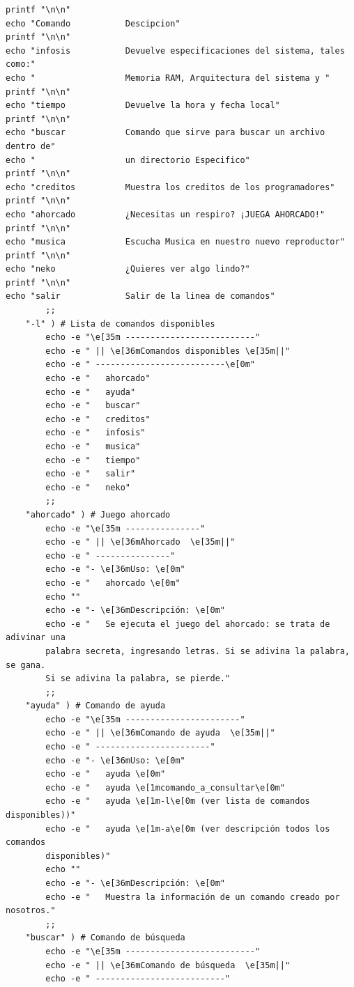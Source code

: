 \documentclass[12pt,a4paper]{article}
\begin{document}
\begin{lstlisting}[style=BashInputStyle]
printf "\n\n"
echo "Comando           Descipcion"
printf "\n\n"
echo "infosis           Devuelve especificaciones del sistema, tales como:"
echo "                  Memoria RAM, Arquitectura del sistema y "
printf "\n\n"
echo "tiempo            Devuelve la hora y fecha local"
printf "\n\n"
echo "buscar            Comando que sirve para buscar un archivo dentro de"
echo "                  un directorio Especifico"
printf "\n\n"
echo "creditos          Muestra los creditos de los programadores"
printf "\n\n"
echo "ahorcado          ¿Necesitas un respiro? ¡JUEGA AHORCADO!"
printf "\n\n"
echo "musica            Escucha Musica en nuestro nuevo reproductor"
printf "\n\n"
echo "neko              ¿Quieres ver algo lindo?"
printf "\n\n"
echo "salir             Salir de la linea de comandos"
        ;;
    "-l" ) # Lista de comandos disponibles
        echo -e "\e[35m --------------------------"
        echo -e " || \e[36mComandos disponibles \e[35m||"
        echo -e " --------------------------\e[0m"
        echo -e "   ahorcado"    
        echo -e "   ayuda"
        echo -e "   buscar"
        echo -e "   creditos"
        echo -e "   infosis"
        echo -e "   musica"
        echo -e "   tiempo"
        echo -e "   salir"
        echo -e "   neko"
        ;;
    "ahorcado" ) # Juego ahorcado
        echo -e "\e[35m ---------------"
        echo -e " || \e[36mAhorcado  \e[35m||"
        echo -e " ---------------"
        echo -e "- \e[36mUso: \e[0m"
        echo -e "   ahorcado \e[0m"
        echo ""
        echo -e "- \e[36mDescripción: \e[0m"
        echo -e "   Se ejecuta el juego del ahorcado: se trata de adivinar una 
        palabra secreta, ingresando letras. Si se adivina la palabra, se gana.
        Si se adivina la palabra, se pierde."
        ;;
    "ayuda" ) # Comando de ayuda
        echo -e "\e[35m -----------------------"
        echo -e " || \e[36mComando de ayuda  \e[35m||"
        echo -e " -----------------------"
        echo -e "- \e[36mUso: \e[0m"
        echo -e "   ayuda \e[0m"
        echo -e "   ayuda \e[1mcomando_a_consultar\e[0m"
        echo -e "   ayuda \e[1m-l\e[0m (ver lista de comandos disponibles))"
        echo -e "   ayuda \e[1m-a\e[0m (ver descripción todos los comandos
        disponibles)"
        echo ""
        echo -e "- \e[36mDescripción: \e[0m"
        echo -e "   Muestra la información de un comando creado por nosotros."  
        ;;
    "buscar" ) # Comando de búsqueda
        echo -e "\e[35m --------------------------"
        echo -e " || \e[36mComando de búsqueda  \e[35m||"
        echo -e " --------------------------"

\end{lstlisting}
\end{document}
